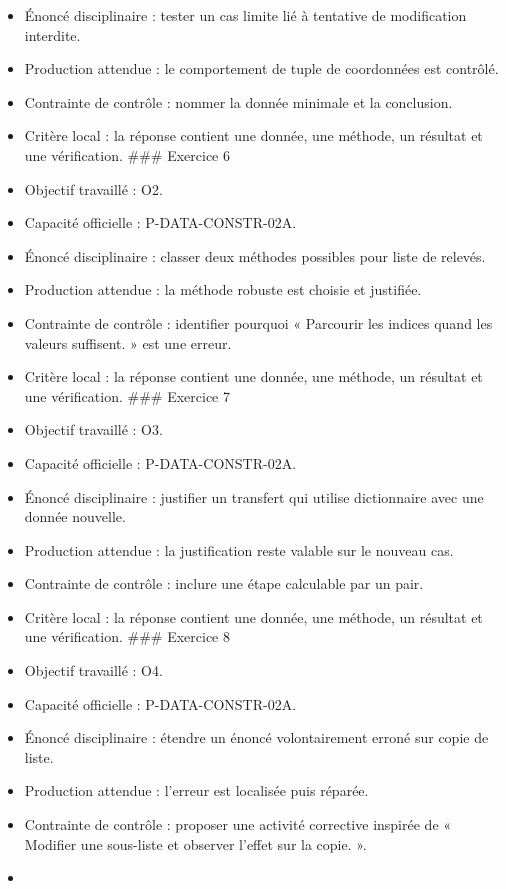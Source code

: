 \begin{itemize}
\item
  Énoncé disciplinaire : tester un cas limite lié à tentative de
  modification interdite.
\item
  Production attendue : le comportement de tuple de coordonnées est
  contrôlé.
\item
  Contrainte de contrôle : nommer la donnée minimale et la conclusion.
\item
  Critère local : la réponse contient une donnée, une méthode, un
  résultat et une vérification. \#\#\# Exercice 6
\item
  Objectif travaillé : O2.
\item
  Capacité officielle : P-DATA-CONSTR-02A.
\item
  Énoncé disciplinaire : classer deux méthodes possibles pour liste de
  relevés.
\item
  Production attendue : la méthode robuste est choisie et justifiée.
\item
  Contrainte de contrôle : identifier pourquoi « Parcourir les indices
  quand les valeurs suffisent. » est une erreur.
\item
  Critère local : la réponse contient une donnée, une méthode, un
  résultat et une vérification. \#\#\# Exercice 7
\item
  Objectif travaillé : O3.
\item
  Capacité officielle : P-DATA-CONSTR-02A.
\item
  Énoncé disciplinaire : justifier un transfert qui utilise dictionnaire
  avec une donnée nouvelle.
\item
  Production attendue : la justification reste valable sur le nouveau
  cas.
\item
  Contrainte de contrôle : inclure une étape calculable par un pair.
\item
  Critère local : la réponse contient une donnée, une méthode, un
  résultat et une vérification. \#\#\# Exercice 8
\item
  Objectif travaillé : O4.
\item
  Capacité officielle : P-DATA-CONSTR-02A.
\item
  Énoncé disciplinaire : étendre un énoncé volontairement erroné sur
  copie de liste.
\item
  Production attendue : l'erreur est localisée puis réparée.
\item
  Contrainte de contrôle : proposer une activité corrective inspirée de
  « Modifier une sous-liste et observer l'effet sur la copie. ».
\item

\end{itemize}

